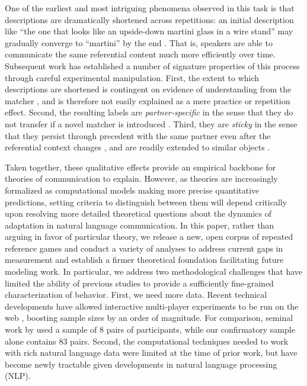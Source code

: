\documentclass[alpha-refs]{wiley-article}
\begin{document}
One of the earliest and most intriguing phenomena observed in this task is that descriptions are dramatically shortened across repetitions: an initial description like ``the one that looks like an upside-down martini glass in a wire stand'' may gradually converge to ``martini'' by the end  \citep{KraussWeinheimer64_ReferencePhrases}. 
That is, speakers are able to communicate the same referential content much more efficiently over time.
Subsequent work has established a number of signature properties of this process through careful experimental manipulation.
First, the extent to which descriptions are shortened is contingent on evidence of understanding from the matcher \citep{KraussWeinheimer66_Tangrams,KraussEtAl77_AudioVisualBackChannel,HupetChantraine92_CollaborationOrRepitition}, and is therefore not easily explained as a mere practice or repetition effect.
Second, the resulting labels are \emph{partner-specific} in the sense that they do not transfer if a novel matcher is introduced \citep{WilkesGibbsClark92_CoordinatingBeliefs,MetzingBrennan03_PartnerSpecificPacts,brennan_partner-specific_2009}.
Third, they are \emph{sticky} in the sense that they persist through precedent with the same partner even after the referential context changes \citep{BrennanClark96_ConceptualPactsConversation}, and are readily extended to similar objects \citep{MarkmanMakin98_ReferentialCommunicationCategory}.

Taken together, these qualitative effects provide an empirical backbone for theories of communication to explain. %
However, as theories are increasingly formalized as computational models making more precise quantitative predictions, setting criteria to distinguish between them will depend critically upon resolving more detailed theoretical questions about the dynamics of adaptation in natural language communication.
In this paper, rather than arguing in favor of particular theory, we release a new, open corpus of repeated reference games and conduct a variety of analyses to address current gaps in measurement and establish a firmer theoretical foundation facilitating future modeling work.
In particular, we address two methodological challenges that have limited the ability of previous studies to provide a sufficiently fine-grained characterization of behavior.
First, we need more data.
Recent technical developments have allowed interactive multi-player experiments to be run on the web \citep{Hawkins15_RealTimeWebExperiments}, boosting sample sizes by an order of magnitude. 
For comparison, seminal work by \cite{ClarkWilkesGibbs86_ReferringCollaborative} used a sample of 8 pairs of participants, while our confirmatory sample alone contains 83 pairs.
Second, the computational techniques needed to work with rich natural language data were limited at the time of prior work, but have become newly tractable given developments in natural language processing (NLP).
\end{document}
